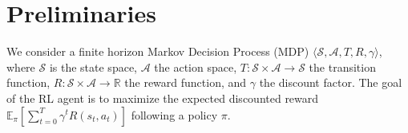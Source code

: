\section{Preliminaries}

We consider a finite horizon Markov Decision Process (MDP) $\langle \mathcal{S}, \mathcal{A}, T, R, \gamma \rangle$, where $\mathcal{S}$ is the state space, $\mathcal{A}$ the action space, $T:\mathcal{S} \times \mathcal{A} \rightarrow \mathcal{S}$ the transition function, $R:\mathcal{S} \times \mathcal{A} \rightarrow \mathbb{R}$ the reward function, and $\gamma$ the discount factor. The goal of the RL agent is to maximize the expected discounted reward $\mathbb{E}_{\pi}[\sum_{t=0}^{T}\gamma^t R(s_t, a_t)]$ following a policy $\pi$. 